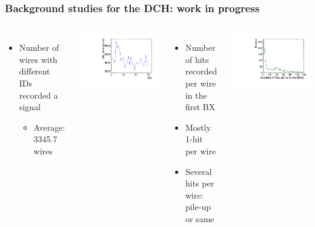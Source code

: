 \documentclass[hyperref={colorlinks=true,pdfpagelabels=false,linkcolor=black}, xcolor=dvipsnames,10pt]{beamer}
\begin{document}
\begin{frame}
	\frametitle{Background studies for the DCH: work in progress}

	\begin{columns}[t]
		\begin{itemize}
		\item Number of wires with different IDs recorded a signal
			\begin{itemize}
			\item Average: 3345.7 wires
			\end{itemize}
		\end{itemize}
	
		\centering
		\includegraphics[width=\textwidth]{../figures/DCH/differentWires_hit_perBX.pdf}
	

		
		\begin{itemize}
		\item Number of hits recorded per wire in the first BX
		\item Mostly 1-hit per wire
		\item Several hits per wire: pile-up or same 
		\end{itemize}
		\centering
		\includegraphics[width=\textwidth]{../figures/DCH/nb_hits_per_wire.pdf}
		

\end{columns}
\end{frame}
\end{document}
